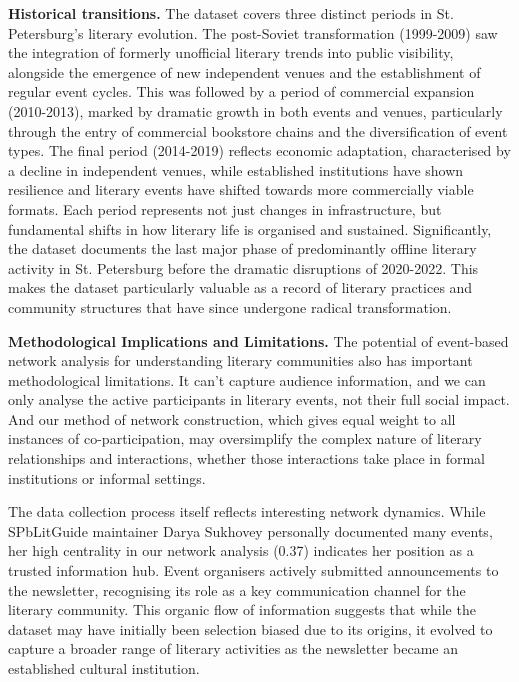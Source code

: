 \documentclass{jcls}
\begin{document}
\textbf{Historical transitions.} The dataset covers three distinct periods in St. Petersburg's literary evolution. The post-Soviet transformation (1999-2009) saw the integration of formerly unofficial literary trends into public visibility, alongside the emergence of new independent venues and the establishment of regular event cycles. This was followed by a period of commercial expansion (2010-2013), marked by dramatic growth in both events and venues, particularly through the entry of commercial bookstore chains and the diversification of event types. The final period (2014-2019) reflects economic adaptation, characterised by a decline in independent venues, while established institutions have shown resilience and literary events have shifted towards more commercially viable formats. Each period represents not just changes in infrastructure, but fundamental shifts in how literary life is organised and sustained. Significantly, the dataset documents the last major phase of predominantly offline literary activity in St. Petersburg before the dramatic disruptions of 2020-2022. This makes the dataset particularly valuable as a record of literary practices and community structures that have since undergone radical transformation.

\textbf{Methodological Implications and Limitations.} The potential of event-based network analysis for understanding literary communities also has important methodological limitations. It can't capture audience information, and we can only analyse the active participants in literary events, not their full social impact. And our method of network construction, which gives equal weight to all instances of co-participation, may oversimplify the complex nature of literary relationships and interactions, whether those interactions take place in formal institutions or informal settings.

The data collection process itself reflects interesting network dynamics. While SPbLitGuide maintainer Darya Sukhovey personally documented many events, her high centrality in our network analysis (0.37) indicates her position as a trusted information hub. Event organisers actively submitted announcements to the newsletter, recognising its role as a key communication channel for the literary community. This organic flow of information suggests that while the dataset may have initially been selection biased due to its origins, it evolved to capture a broader range of literary activities as the newsletter became an established cultural institution.
\end{document}
